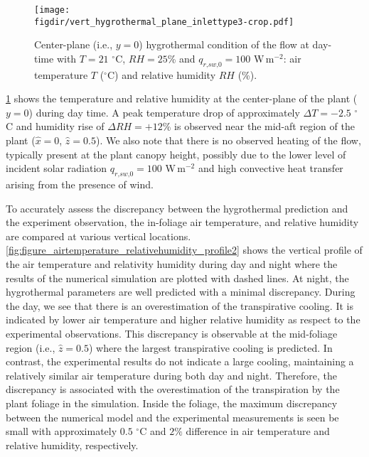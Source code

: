 \begin{figure}[h]
	\centering
	\texttt{[image: \\figdir/vert\_hygrothermal\_plane\_inlettype3-crop.pdf]}
	\caption{Center-plane (i.e., $y=0$) hygrothermal condition of the flow at day-time with $T = 21$ $^{\circ}$C, $\textit{RH}=25$\% and $q_{\textit{r,sw,0}} = 100$ W\,m$^{-2}$:  air temperature $T$ ($^{\circ}$C) and  relative humidity $\mathit{RH}$ (\%).}
	\label{fig:vert_hygrothermal_plane}
\end{figure}


\cref{fig:vert_hygrothermal_plane} shows the temperature and relative humidity at the center-plane of the plant ($y=0$) during day time. A peak temperature drop of approximately $\Delta T = -2.5$ $^{\circ}$C and humidity rise of $\Delta RH = +12$\% is observed near the mid-aft region of the plant ($\hat{x} = 0$, $\hat{z} = 0.5$). We also note that there is no observed heating of the flow, typically present at the plant canopy height, possibly due to the lower level of incident solar radiation $q_{\textit{r,sw,0}} = 100$ W\,m$^{-2}$ and high convective heat transfer arising from the presence of wind. 

To accurately assess the discrepancy between the hygrothermal prediction and the experiment observation, the in-foliage air temperature, and relative humidity are compared at various vertical locations. \cref{fig:figure_airtemperature_relativehumidity_profile2} shows the vertical profile of the air temperature and relativity humidity during day and night where the results of the numerical simulation are plotted with dashed lines. At night, the hygrothermal parameters are well predicted with a minimal discrepancy. During the day, we see that there is an overestimation of the transpirative cooling. It is indicated by lower air temperature and higher relative humidity as respect to the experimental observations. This discrepancy is observable at the mid-foliage region (i.e., $\hat{z} = 0.5$) where the largest transpirative cooling is predicted. In contrast, the experimental results do not indicate a large cooling, maintaining a relatively similar air temperature during both day and night. Therefore, the discrepancy is associated with the overestimation of the transpiration by the plant foliage in the simulation. Inside the foliage, the maximum discrepancy between the numerical model and the experimental measurements is seen be small with approximately $0.5$ $^{\circ}$C and $2\%$ difference in air temperature and relative humidity, respectively. 

